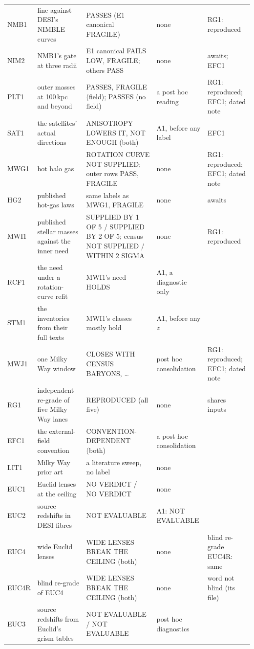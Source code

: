 \documentclass[10pt]{article}
\begin{document}
{\begin{longtable}{@{}p{1.5cm}p{3.2cm}p{4.3cm}p{3.3cm}p{3.2cm}@{}}
NMB1 & line against DESI's NIMBLE curves & PASSES (E1 canonical FRAGILE) & none & RG1: reproduced\\
NIM2 & NMB1's gate at three radii & E1 canonical FAILS LOW, FRAGILE; others PASS & none & awaits; EFC1\\
PLT1 & outer masses at 100\,kpc and beyond & PASSES, FRAGILE (field); PASSES (no field) & a post hoc reading & RG1: reproduced; EFC1; dated note\\
SAT1 & the satellites' actual directions & ANISOTROPY LOWERS IT, NOT ENOUGH (both) & A1, before any label & EFC1\\
MWG1 & hot halo gas & ROTATION CURVE NOT SUPPLIED; outer rows PASS, FRAGILE & none & RG1: reproduced; EFC1; dated note\\
HG2 & published hot-gas laws & same labels as MWG1, FRAGILE & none & awaits\\
MWI1 & published stellar masses against the inner need & SUPPLIED BY 1 OF 5 / SUPPLIED BY 2 OF 5; census NOT SUPPLIED / WITHIN 2 SIGMA & none & RG1: reproduced\\
RCF1 & the need under a rotation-curve refit & MWI1's need HOLDS & A1, a diagnostic only & \\
STM1 & the inventories from their full texts & MWI1's classes mostly hold & A1, before any $z$ & \\
MWJ1 & one Milky Way window & CLOSES WITH CENSUS BARYONS, \dots & post hoc consolidation & RG1: reproduced; EFC1; dated note\\
RG1 & independent re-grade of five Milky Way lanes & REPRODUCED (all five) & none & shares inputs\\
EFC1 & the external-field convention & CONVENTION-DEPENDENT (both) & a post hoc consolidation & \\
LIT1 & Milky Way prior art & a literature sweep, no label & none & \\
EUC1 & Euclid lenses at the ceiling & NO VERDICT / NO VERDICT & none & \\
EUC2 & source redshifts in DESI fibres & NOT EVALUABLE & A1: NOT EVALUABLE & \\
EUC4 & wide Euclid lenses & WIDE LENSES BREAK THE CEILING (both) & none & blind re-grade EUC4R: same\\
EUC4R & blind re-grade of EUC4 & WIDE LENSES BREAK THE CEILING (both) & none & word not blind (its file)\\
EUC3 & source redshifts from Euclid's grism tables & NOT EVALUABLE / NOT EVALUABLE & post hoc diagnostics & \\

\end{longtable}}
\end{document}
